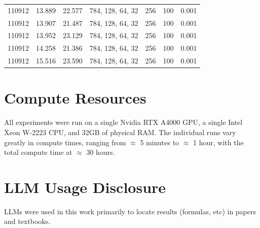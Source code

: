 \documentclass{article} %
\theoremstyle{definition}
\begin{document}
\begin{table}[H]
\begin{tabular}{r c c l r r c}
    110912 & 13.889 & 22.577 & 784, 128, 64, 32 & 256 & 100 & 0.001 \\
    110912 & 13.907 & 21.487 & 784, 128, 64, 32 & 256 & 100 & 0.001 \\
    110912 & 13.952 & 23.129 & 784, 128, 64, 32 & 256 & 100 & 0.001 \\
    110912 & 14.258 & 21.386 & 784, 128, 64, 32 & 256 & 100 & 0.001 \\
    110912 & 15.516 & 23.590 & 784, 128, 64, 32 & 256 & 100 & 0.001 \\
    \bottomrule
  \end{tabular}
  \label{tab:spec-llc-mnist2}
\end{table}
\newpage
\section{Compute Resources}\label{app:comp}
All experiments were run on a single Nvidia RTX A4000 GPU, a single Intel Xeon W-2223 CPU, and 32GB of physical RAM. The individual runs vary greatly in compute times, ranging from $\approx$ 5 minutes to $\approx$ 1 hour, with the total compute time at $\approx$ 30 hours.

\section{LLM Usage Disclosure}
LLMs were used in this work primarily to locate results (formulas, etc) in papers and textbooks.
\end{document}
